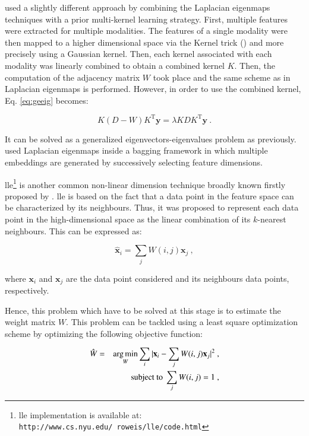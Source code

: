 \cite{Tiwari2009,Tiwari2013} used a slightly different approach by combining the Laplacian eigenmaps techniques with a prior multi-kernel learning strategy. First, multiple features were extracted for multiple modalities. The features of a single modality were then mapped to a higher dimensional space via the Kernel trick (\cite{Aizerman1964}) and more precisely using a Gaussian kernel. Then, each kernel associated with each modality was linearly combined to obtain a combined kernel $K$. Then, the computation of the adjacency matrix $W$ took place and the same scheme as in Laplacian eigenmaps is performed. However, in order to use the combined kernel, Eq. \eqref{eq:geeig} becomes:

\begin{equation}
	K (D-W) K^{\text{T}} \mathbf{y} = \lambda K D K^{\text{T}} \mathbf{y} \ .
	\label{eq:sesmik}
\end{equation}

It can be solved as a generalized eigenvectors-eigenvalues problem as previously. \cite{Viswanath2011} used Laplacian eigenmaps inside a bagging framework in which multiple embeddings are generated by successively selecting feature dimensions.

\ac{lle}\footnote{\ac{lle} implementation is available at: \texttt{http://www.cs.nyu.edu/\allowbreak ~roweis/lle/code.html}} is another common non-linear dimension technique broadly known firstly proposed by \cite{Roweis2000}. \ac{lle} is based on the fact that a data point in the feature space can be characterized by its neighbours. Thus, it was proposed to represent each data point in the high-dimensional space as the linear combination of its $k$-nearest neighbours. This can be expressed as:

\begin{equation}
	\hat{\mathbf{x}}_i = \sum_j W(i,j) \mathbf{x}_j \ ,
	\label{eq:lincomlle}
\end{equation}

\noindent where $\mathbf{x}_i$ and $\mathbf{x}_j$ are the data point considered and its neighbours data points, respectively.

Hence, this problem which have to be solved at this stage is to estimate the weight matrix $W$. This problem can be tackled using a least square optimization scheme by optimizing the following objective function:

\begin{eqnarray}
	\hat{W} & = & \operatorname*{arg\,min}_{W} \sum_i | \mathbf{x}_i - \sum_j W(i,j)\mathbf{x}_j |^{2} \ , \label{eq:lslle} \\
	&& \text{subject to } \sum_j W(i,j) = 1 \ , \nonumber
\end{eqnarray}

